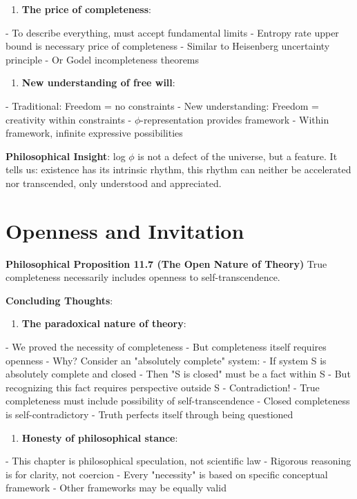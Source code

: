 \begin{enumerate}
\item \textbf{The price of completeness}:
\end{enumerate}
   - To describe everything, must accept fundamental limits
   - Entropy rate upper bound is necessary price of completeness
   - Similar to Heisenberg uncertainty principle
   - Or Godel incompleteness theorems

\begin{enumerate}
\item \textbf{New understanding of free will}:
\end{enumerate}
   - Traditional: Freedom = no constraints
   - New understanding: Freedom = creativity within constraints
   - $\phi$-representation provides framework
   - Within framework, infinite expressive possibilities

\textbf{Philosophical Insight}:
log $\phi$ is not a defect of the universe, but a feature.
It tells us: existence has its intrinsic rhythm,
this rhythm can neither be accelerated nor transcended,
only understood and appreciated.

\section{Openness and Invitation}
\label{sec:ch11_philosophy:openness-and-invitation}

\textbf{Philosophical Proposition 11.7 (The Open Nature of Theory)}
True completeness necessarily includes openness to self-transcendence.

\textbf{Concluding Thoughts}:

\begin{enumerate}
\item \textbf{The paradoxical nature of theory}:
\end{enumerate}
   - We proved the necessity of completeness
   - But completeness itself requires openness
   - Why? Consider an "absolutely complete" system:
     - If system S is absolutely complete and closed
     - Then "S is closed" must be a fact within S
     - But recognizing this fact requires perspective outside S
     - Contradiction!
   - True completeness must include possibility of self-transcendence
   - Closed completeness is self-contradictory
   - Truth perfects itself through being questioned

\begin{enumerate}
\item \textbf{Honesty of philosophical stance}:
\end{enumerate}
   - This chapter is philosophical speculation, not scientific law
   - Rigorous reasoning is for clarity, not coercion
   - Every "necessity" is based on specific conceptual framework
   - Other frameworks may be equally valid

